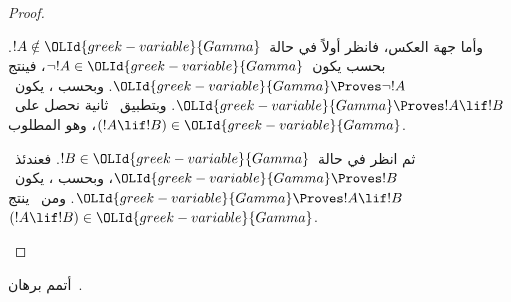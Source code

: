 \documentclass[../../../include/open-logic-section]{subfiles}
\begin{document}
\begin{proof}
\begin{enumerate}
{{وأما جهة العكس، فانظر أولاً في حالة~$!A \notin \OLId{greek-variable}{Gamma}$. بحسب
 يكون~$\lnot !A \in \OLId{greek-variable}{Gamma}$، فينتج
$\OLId{greek-variable}{Gamma} \Proves \lnot !A$. وبحسب
،
يكون~$\OLId{greek-variable}{Gamma} \Proves !A \lif !B$. وبتطبيق~
ثانية نحصل على~$(!A \lif !B) \in \OLId{greek-variable}{Gamma}$، وهو المطلوب.

ثم انظر في حالة~$!B \in \OLId{greek-variable}{Gamma}$. فعندئذ~$\OLId{greek-variable}{Gamma} \Proves !B$، وبحسب
،
يكون~$\OLId{greek-variable}{Gamma} \Proves !A \lif !B$. ومن~ ينتج
$(!A \lif !B) \in \OLId{greek-variable}{Gamma}$.}}
\end{enumerate}
\end{proof}

\begin{prob}
أتمم برهان~.
\end{prob}
\end{document}
